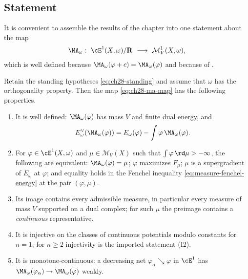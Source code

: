 \subsection{Statement}
\label{sec:ch28-cy-statement}

It is convenient to assemble the results of the chapter into one statement
about the map
\begin{equation}
\label{eq:ch28-ma-map}
 \MA_\omega:\ \cE^1(X,\omega)/\mathbf R\ \longrightarrow\
 \mathcal M^1_V(X,\omega),
\end{equation}
which is well defined because $\MA_\omega(\varphi+c)=\MA_\omega(\varphi)$
and because of \Cref{prop:ch28-dual-energy-of-ma}.

\begin{theorem}
\label{thm:ch28-calabi-yau}
Retain the standing hypotheses \eqref{eq:ch28-standing} and assume that
$\omega$ has the orthogonality property.  Then the map
\eqref{eq:ch28-ma-map} has the following properties.
\begin{enumerate}
\item\label{itm:ch28-cy:into}
 It is well defined: $\MA_\omega(\varphi)$ has mass $V$ and finite dual
 energy, and
 \[
  E^\vee_\omega(\MA_\omega(\varphi))
  =E_\omega(\varphi)-\int\varphi\,\MA_\omega(\varphi).
 \]
\item\label{itm:ch28-cy:variational}
 For $\varphi\in\cE^1(X,\omega)$ and $\mu\in\mathcal M_V(X)$ such
 that $\int\varphi\,\rd\mu> -\infty$, the following are equivalent:
 $\MA_\omega(\varphi)=\mu$; $\varphi$
 maximizes $F_\mu$; $\mu$ is a supergradient of $E_\omega$ at
 $\varphi$; and equality holds in the Fenchel inequality
 \eqref{eq:measure-fenchel-energy} at the pair $(\varphi,\mu)$.
\item\label{itm:ch28-cy:onto}
 Its image contains every admissible measure, in particular every measure of
 mass $V$ supported on a dual complex; for such $\mu$ the preimage
 contains a \emph{continuous} representative.
\item\label{itm:ch28-cy:injective}
 It is injective on the classes of continuous potentials modulo constants
 for $n=1$; for $n\geq2$ injectivity is the imported statement
 \textup{(I2)}.
\item\label{itm:ch28-cy:usc}
 It is monotone-continuous: a decreasing net
 $\varphi_\alpha\searrow\varphi$ in $\cE^1$ has
 $\MA_\omega(\varphi_\alpha)\to\MA_\omega(\varphi)$ weakly.
\end{enumerate}
\end{theorem}

